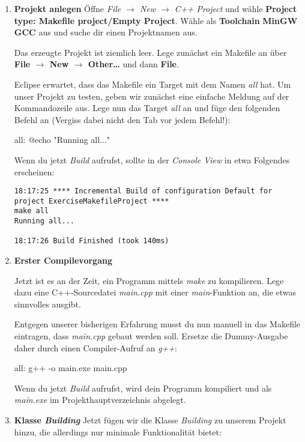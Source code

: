 \begin{enumerate}
\item\textbf{Projekt anlegen}
Öffne \emph{File $\to$ New $\to$ C++ Project} und wähle \textbf{Project type: Makefile project/Empty Project}.
Wähle als \textbf{Toolchain} \textbf{MinGW GCC} aus und suche dir einen Projektnamen aus.

Das erzeugte Projekt ist ziemlich leer.
Lege zunächst ein Makefile an über \textbf{File $\to$ New $\to$ Other\dots} und dann \textbf{File}.

Eclipse erwartet, dass das Makefile ein Target mit dem Namen \emph{all} hat.
Um unser Projekt zu testen, geben wir zunächst eine einfache Meldung auf der Kommandozeile aus.
Lege nun das Target \emph{all} an und füge den folgenden Befehl an (Vergiss dabei nicht den Tab vor jedem Befehl!):
\begin{lstmake}
all:	
	@echo "Running all..."
\end{lstmake}

Wenn du jetzt \emph{Build} aufrufst, sollte in der \emph{Console View} in etwa Folgendes erscheinen:
\begin{verbatim}
18:17:25 **** Incremental Build of configuration Default for project ExerciseMakefileProject ****
make all 
Running all...

18:17:26 Build Finished (took 140ms)
\end{verbatim}

\item\textbf{Erster Compilevorgang}

Jetzt ist es an der Zeit, ein Programm mittels \emph{make} zu kompilieren.
Lege dazu eine C++-Sourcedatei \emph{main.cpp} mit einer \emph{main}-Funktion an, die etwas sinnvolles ausgibt.

Entgegen unserer bisherigen Erfahrung musst du nun manuell in das Makefile eintragen, dass \emph{main.cpp} gebaut werden soll.
Ersetze die Dummy-Ausgabe daher durch einen Compiler-Aufruf an \emph{g++}:
\begin{lstmake}
all:
	g++ -o main.exe main.cpp
\end{lstmake}

Wenn du jetzt \emph{Build} aufrufst, wird dein Programm kompiliert und als \emph{main.exe} im Projekthauptverzeichnis abgelegt.

\item\textbf{Klasse \emph{Building}}
Jetzt fügen wir die Klasse \emph{Building} zu unserem Projekt hinzu, die allerdings nur minimale Funktionalität bietet:


\end{enumerate}
